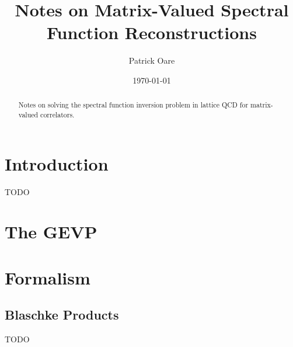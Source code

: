 \def \root {../../../notes}			%


\usepackage[toc,page]{appendix}
\usepackage{listings}

\newcommand{\poarecomment}[1]{\textcolor{red}{#1}}


\usepackage[numbers,sort&compress]{natbib}

\renewcommand{\im}{\mathrm{Im}}
\newcommand{\re}{\mathrm{Re}}
\newcommand{\esssup}{\mathrm{ess}\,\mathrm{sup}}



\title{Notes on Matrix-Valued Spectral Function Reconstructions}
\author{Patrick Oare}

\date{\today}

\maketitle

\begin{abstract}
Notes on solving the spectral function inversion problem in lattice QCD for matrix-valued correlators. 
\end{abstract}

\section{Introduction}

TODO

\section{The GEVP}

\section{Formalism}




\newpage
\begin{appendices}

\newpage
\section{Blaschke Products}
\label{app:blaschke}

TODO
\end{appendices}

